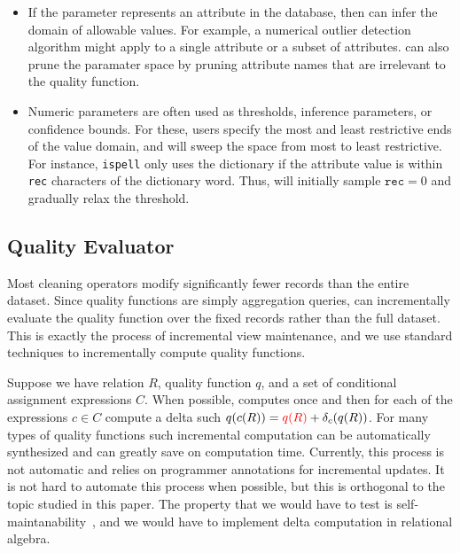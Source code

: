 \begin{itemize}[leftmargin=*,topsep=.3em,itemsep=-.2em,partopsep=-.5em]
  \item {} If the parameter represents an attribute in the database, then \sys can infer the domain of allowable values.   For example, a numerical outlier detection algorithm might apply to a single attribute or a subset of attributes. \sys can also prune the paramater space by pruning attribute names that are irrelevant to the quality function.  

  \item {} Numeric parameters are often used as thresholds, inference parameters, or confidence bounds.  For these, users specify the most and least restrictive ends of the value domain, and \sys will sweep the space from most to least restrictive.   For instance, \texttt{ispell} only uses the dictionary if the attribute value is within \texttt{rec} characters of the dictionary word.  Thus, \sys will initially sample $\texttt{rec}=0$ and gradually relax the threshold.   
\end{itemize}



\subsection{Quality Evaluator}\label{s:qualityivm}
Most cleaning operators modify significantly fewer records than the entire dataset.  Since quality functions are simply aggregation queries, \sys can incrementally evaluate the quality function over the fixed records rather than the full dataset.  
This is exactly the process of incremental view maintenance, and we use standard techniques to incrementally compute quality functions.

Suppose we have relation $R$, quality function $q$, and a set of conditional assignment expressions $C$.  When possible, \sys computes  once and then for each of the expressions $c \in C$ compute a delta such $q(c(R)) = \textcolor{red}{q(R)} + \delta_c(q(R))$.
For many types of quality functions such incremental computation can be automatically synthesized and can greatly save on computation time.
Currently, this process is not automatic and \sys relies on programmer annotations for incremental updates.
It is not hard to automate this process when possible, but this is orthogonal to the topic studied in this paper.
The property that we would have to test is self-maintanability~\cite{gupta1996data}, and we would have to implement delta computation in relational algebra. 

